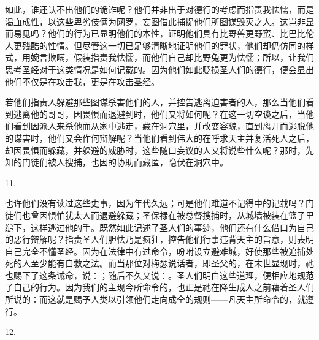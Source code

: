 如此，谁还认不出他们的诡诈呢？他们并非出于对德行的考虑而指责我怯懦，而是渴血成性，以这些卑劣伎俩为网罗，妄图借此捕捉他们所图谋毁灭之人。这岂非显而易见吗？他们的行为已显明他们的本性，证明他们具有比野兽更野蛮、比巴比伦人更残酷的性情。但尽管这一切已足够清晰地证明他们的罪状，他们却仍仿同的样式，用婉言欺瞒，假装指责我怯懦，而他们自己却比野兔更为怯懦；所以，让我们思考圣经对于这类情况是如何记载的。因为他们如此贬损圣人们的德行，便会显出他们不仅是在攻击我，更是在攻击圣经。\par

若他们指责人躲避那些图谋杀害他们的人，并控告逃离迫害者的人，那么当他们看到逃离他的哥哥，因畏惧而退避到时，他们又将如何呢？在这一切空谈之后，当他们看到因派人来杀他而从家中逃走，藏在洞穴里，并改变容貌，直到离开而逃脱他的谋害时，他们又会作何辩解呢？当他们看到伟大的在呼求天主并复活死人之后，却因畏惧而躲藏，并躲避的威胁时，这些随口妄议的人又将说些什么呢？那时，先知的门徒们被人搜捕，也因的协助而藏匿，隐伏在洞穴中。\par

11. \par

也许他们没有读过这些史事，因为年代久远；可是他们难道不记得中的记载吗？门徒们也曾因惧怕犹太人而退避躲藏；圣保禄在被总督搜捕时，从城墙被装在篮子里缒下，这样逃过他的手。既然如此记述了圣人们的事迹，他们还有什么借口为自己的恶行辩解呢？指责圣人们胆怯乃是疯狂，控告他们行事违背天主的旨意，则表明自己完全不懂圣经。因为在法律中有过命令，吩咐设立避难城，好使那些被追捕处死的人至少能有自救之法。而当那位对梅瑟说话者，即圣父的，在末世显现时，祂也赐下了这条诫命，说：；随后不久又说：。圣人们明白这些道理，便相应地规范了自己的行为。因为我们的主现今所命令的，也正是祂在降生成人之前藉着圣人们所说的：而这就是赐予人类以引领他们走向成全的规则——凡天主所命令的，就遵行。\par

12. \par

